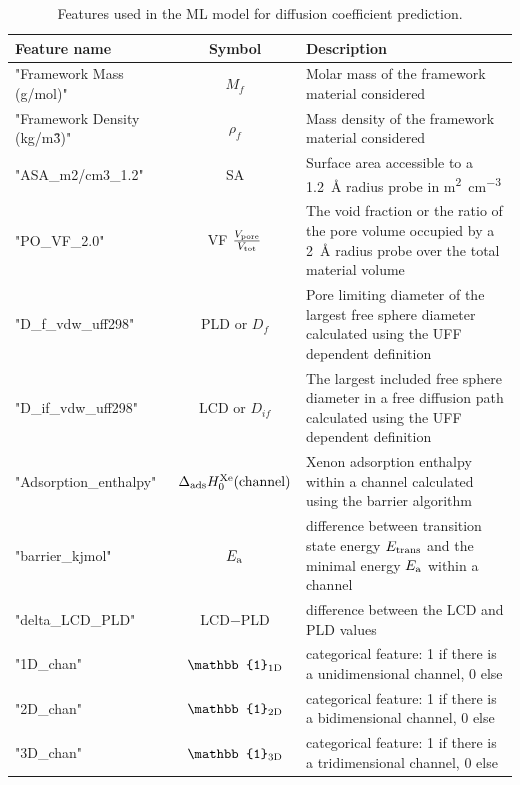 \documentclass[main]{subfiles}
\begin{document}
\begin{table}[ht]
  \setlength{\extrarowheight}{1pt}
  \centering
  \begin{tabular}{|l|c|m{8cm}|}
  \hline
    Feature name  &  Symbol   &   Description\\
  \hline
      "Framework Mass (g/mol)" &   $M_f$ &   Molar mass of the framework material considered  \\
      "Framework Density (kg/m\^3)" &   $\rho_f$ &   Mass density of the framework material considered  \\
      "ASA\_m2/cm3\_1.2" &   SA &   Surface area accessible to a \SI{1.2}{\angstrom} radius probe in \si{\square\m\per\cubic\cm}  \\
      "PO\_VF\_2.0" &  VF $\tfrac{V_{\text{pore}}}{V_{\text{tot}}}$ &  The void fraction or the ratio of the pore volume occupied by a \SI{2}{\angstrom} radius probe over the total material volume  \\
      "D\_f\_vdw\_uff298" &   PLD or $D_f$  &   Pore limiting diameter of the largest free sphere diameter calculated using the UFF dependent definition  \\
      "D\_if\_vdw\_uff298" &   LCD or $D_{if}$ &   The largest included free sphere diameter in a free diffusion path calculated using the UFF dependent definition  \\
      "Adsorption\_enthalpy" &   $\Delta_{\text{ads}}H_0^{\text{Xe}}(\text{channel})$  &   Xenon adsorption enthalpy within a channel calculated using the barrier algorithm  \\
      "barrier\_kjmol" &   $E_{\text{a}}$  &   difference between transition state energy $E_{\text{trans}}$ and the minimal energy $E_{\text{a}}$ within a channel \\
      "delta\_LCD\_PLD" &   LCD$-$PLD  &   difference between the LCD and PLD values \\
      "1D\_chan" &  $\mathbb{1}\e{1D}$   &   categorical feature: 1 if there is a unidimensional channel, 0 else \\
      "2D\_chan" &  $\mathbb{1}\e{2D}$   &   categorical feature: 1 if there is a bidimensional channel, 0 else \\
      "3D\_chan" &  $\mathbb{1}\e{3D}$   &   categorical feature: 1 if there is a tridimensional channel, 0 else \\
    \hline
  \end{tabular}
  \caption{ Features used in the ML model for diffusion coefficient prediction. }\label{Table:feat_diff}
\end{table}
\end{document}
